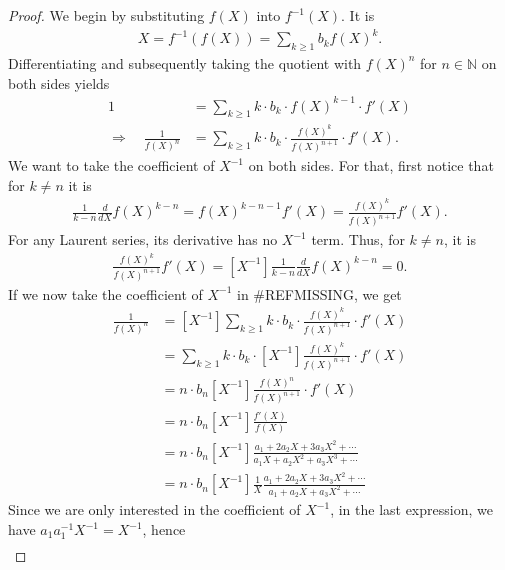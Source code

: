 \documentclass[a4paper]{article}
\theoremstyle{definition}
\begin{document}
\begin{proof}
    We begin by substituting \(f(X)\) into \(f^{-1}(X)\). It is
    \begin{align*}
        X = f^{-1}(f(X)) = \sum_{k \geq 1} b_k f(X)^k \text{.}
    \end{align*}
    Differentiating and subsequently taking the quotient with \(f(X)^n\) for \(n \in \mathbb{N}\) on both sides yields
    \begin{align*}
        1 &= \sum_{k \geq 1} k \cdot b_k \cdot f(X)^{k - 1} \cdot f'(X) \\
        \Rightarrow \quad \frac{1}{f(X)^n} &= \sum_{k \geq 1} k \cdot b_k \cdot \frac{f(X)^{k}}{f(X)^{n+1}} \cdot f'(X) \text{.}
    \end{align*}
    We want to take the coefficient of \(X^{-1}\) on both sides. For that, first notice that for \(k \neq n\) it is
    \begin{align*}
        \frac{1}{k - n} \frac{d}{dX} f(X)^{k - n} = f(X)^{k - n -1} f'(X) = \frac{f(X)^{k}}{f(X)^{n + 1}} f'(X) \text{.}
    \end{align*}
    For any Laurent series, its derivative has no \(X^{-1}\) term. Thus, for \(k \neq n\), it is
    \begin{align*}
        [X^{-1}]\frac{f(X)^{k}}{f(X)^{n + 1}} f'(X) = [X^{-1}] \frac{1}{k - n} \frac{d}{dX} f(X)^{k - n} = 0 \text{.}
    \end{align*}
    If we now take the coefficient of \(X^{-1}\) in \#REFMISSING, we get
    \begin{align}
        [X^{-1}] \frac{1}{f(X)^n} &= [X^{-1}] \sum_{k \geq 1} k \cdot b_k \cdot \frac{f(X)^{k}}{f(X)^{n+1}} \cdot f'(X) \\
        &= \sum_{k \geq 1} k \cdot b_k \cdot [X^{-1}] \frac{f(X)^{k}}{f(X)^{n+1}} \cdot f'(X) \\
        &= n \cdot b_n [X^{-1}] \frac{f(X)^n}{f(X)^{n+1}} \cdot f'(X) \\
        &= n \cdot b_n [X^{-1}] \frac{f'(X)}{f(X)} \\
        &= n \cdot b_n [X^{-1}] \frac{a_1 + 2 a_2 X + 3 a_3 X^2 + \cdots}{a_1 X + a_2 X^2 + a_3 X^3 + \cdots} \\
        &= n \cdot b_n [X^{-1}] \frac{1}{X} \frac{a_1 + 2 a_2 X + 3 a_3 X^2 + \cdots}{a_1 + a_2 X + a_3 X^2 + \cdots}
    \end{align}
    Since we are only interested in the coefficient of \(X^{-1}\), in the last expression, we have \(a_1 a_1^{-1} X^{-1} = X^{-1}\), hence
    \begin{align}
        [X^{-1}]
    \end{align}
\end{proof}
\end{document}
